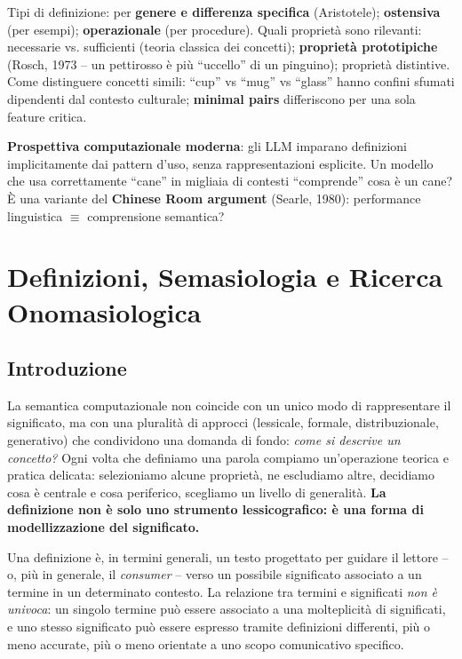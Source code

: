 \documentclass[12pt,a4paper]{article}
\begin{document}
Tipi di definizione: per \textbf{genere e differenza specifica} (Aristotele); \textbf{ostensiva} (per esempi); \textbf{operazionale} (per procedure). Quali propriet\`a sono rilevanti: necessarie vs. sufficienti (teoria classica dei concetti); \textbf{propriet\`a prototipiche} (Rosch, 1973 -- un pettirosso \`e pi\`u ``uccello'' di un pinguino); propriet\`a distintive. Come distinguere concetti simili: ``cup'' vs ``mug'' vs ``glass'' hanno confini sfumati dipendenti dal contesto culturale; \textbf{minimal pairs} differiscono per una sola feature critica.

\begin{quizbox}
\textbf{Prospettiva computazionale moderna}: gli LLM imparano definizioni implicitamente dai pattern d'uso, senza rappresentazioni esplicite. Un modello che usa correttamente ``cane'' in migliaia di contesti ``comprende'' cosa \`e un cane? \`E una variante del \textbf{Chinese Room argument} (Searle, 1980): performance linguistica $\equiv$ comprensione semantica?
\end{quizbox}

\section{Definizioni, Semasiologia e Ricerca Onomasiologica}

\subsection{Introduzione}

La semantica computazionale non coincide con un unico modo di rappresentare il significato, ma con una pluralit\`a di approcci (lessicale, formale, distribuzionale, generativo) che condividono una domanda di fondo: \emph{come si descrive un concetto?} Ogni volta che definiamo una parola compiamo un'operazione teorica e pratica delicata: selezioniamo alcune propriet\`a, ne escludiamo altre, decidiamo cosa \`e centrale e cosa periferico, scegliamo un livello di generalit\`a. \textbf{La definizione non \`e solo uno strumento lessicografico: \`e una forma di modellizzazione del significato.}

\begin{defbox}
Una definizione \`e, in termini generali, un testo progettato per guidare il lettore -- o, pi\`u in generale, il \emph{consumer} -- verso un possibile significato associato a un termine in un determinato contesto. La relazione tra termini e significati \emph{non \`e univoca}: un singolo termine pu\`o essere associato a una molteplicit\`a di significati, e uno stesso significato pu\`o essere espresso tramite definizioni differenti, pi\`u o meno accurate, pi\`u o meno orientate a uno scopo comunicativo specifico.
\end{defbox}
\end{document}
